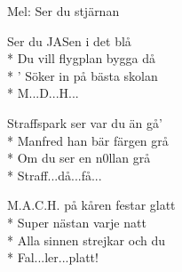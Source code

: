 \begin{SongText}
    \begin{SongInfo}
        Mel: Ser du stjärnan
    \end{SongInfo}
    \begin{SongVerse}
        Ser du JASen i det blå\\*%
        Du vill flygplan bygga då\\*%
        ' Söker in på bästa skolan\\*%
        M...D...H...
    \end{SongVerse}
    \begin{SongVerse}
        Straffspark ser var du än gå'\\*%
        Manfred han bär färgen grå\\*%
        Om du ser en n0llan grå\\*%
        Straff...då...få...
    \end{SongVerse}
    \begin{SongVerse}
        M.A.C.H. på kåren festar glatt\\*%
        Super nästan varje natt\\*%
        Alla sinnen strejkar och du\\*%
        Fal...ler...platt!
    \end{SongVerse}
\end{SongText}
